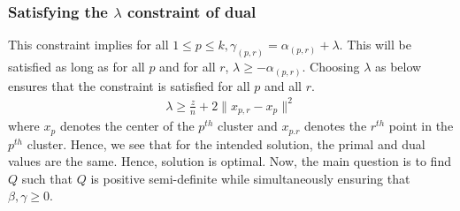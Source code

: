 \subsubsection*{Satisfying the $\lambda$ constraint of dual}
This constraint implies for all $1 \le p \le k, \gamma_{(p,r)} = \alpha_{(p,r)} + \lambda$. This will be satisfied as long as for all $p$ and for all $r$, $\lambda \ge -\alpha_{(p, r)}$. Choosing $\lambda$ as below ensures that the constraint is satisfied for all $p$ and all $r$.
\begin{align}
\lambda \ge \frac{z}{n} + 2\|x_{p,r} - x_p\|^2\label{a-eqn:lambdaLower}
\end{align}
where $x_p$ denotes the center of the $p^{th}$ cluster and $x_{p. r}$ denotes the $r^{th}$ point in the $p^{th}$ cluster. Hence, we see that for the intended solution, the primal and dual values are the same. Hence, solution is optimal. Now, the main question is to find $Q$ such that $Q$ is positive semi-definite while simultaneously ensuring that $\beta, \gamma \ge 0$.  

